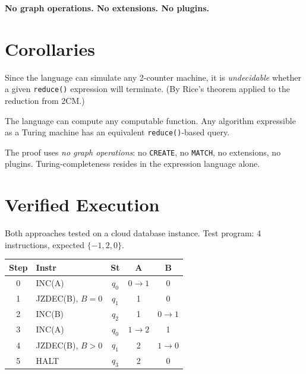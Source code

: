 \documentclass[sigconf, anonymous, review, nonacm]{acmart}
\begin{document}
\smallskip
\noindent\textbf{No graph operations. No extensions. No plugins.}

\section{Corollaries}

\begin{factbox}
Since the language can simulate any 2-counter machine, it is
\emph{undecidable} whether a given \texttt{reduce()} expression
will terminate.
(By Rice's theorem applied to the reduction from 2CM.)
\end{factbox}

\begin{factbox}
The language can compute any computable function.
Any algorithm expressible as a Turing machine has an equivalent
\texttt{reduce()}-based query.
\end{factbox}

\begin{factbox}
The proof uses \emph{no graph operations}: no \texttt{CREATE}, no
\texttt{MATCH}, no extensions, no plugins. Turing-completeness resides
in the expression language alone.
\end{factbox}

\section{Verified Execution}

Both approaches tested on a cloud database instance. Test program:
4 instructions, expected $\{-1, 2, 0\}$.

{\small
\begin{tabular}{@{}clccc@{}}
\toprule
\textbf{Step} & \textbf{Instr} & \textbf{St} & \textbf{A} & \textbf{B} \\
\midrule
0 & INC(A) & $q_0$ & $0{\to}1$ & 0 \\
1 & JZDEC(B), $B{=}0$ & $q_1$ & 1 & 0 \\
2 & INC(B) & $q_2$ & 1 & $0{\to}1$ \\
3 & INC(A) & $q_0$ & $1{\to}2$ & 1 \\
4 & JZDEC(B), $B{>}0$ & $q_1$ & 2 & $1{\to}0$ \\
5 & HALT & $q_3$ & 2 & 0 \\
\bottomrule
\end{tabular}}
\end{document}
